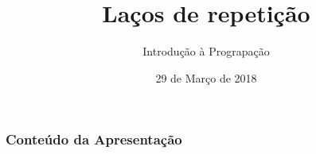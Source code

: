 
\title[PADI-IP]{Laços de repetição}

\author{Introdução à Prograpação}
\date{29 de Março de 2018} %



\begin{frame}
\titlepage %
\end{frame}

\begin{frame}
\frametitle{Conteúdo da Apresentação} %
\tableofcontents %
\end{frame}

